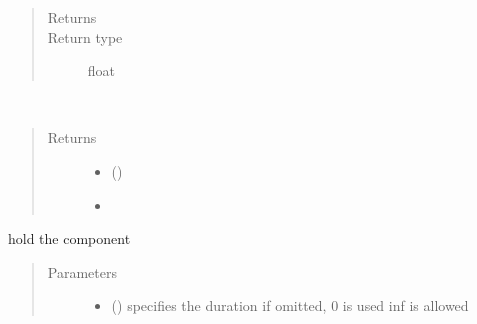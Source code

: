 \documentclass[letterpaper,10pt,english]{sphinxmanual}
\begin{document}
\begin{fulllineitems}
\begin{fulllineitems}
\begin{quote}
\begin{description}
\item[{Returns}] \leavevmode
{}

\item[{Return type}] \leavevmode
float

\end{description}\end{quote}

\end{fulllineitems}


\begin{fulllineitems}
\label{\detokenize{Reference:salabim.Component.failed}}~\begin{quote}\begin{description}
\item[{Returns}] \leavevmode
\begin{itemize}
\item {} 
 ()

\item {} 

\end{itemize}


\end{description}\end{quote}

\end{fulllineitems}


\begin{fulllineitems}
\label{\detokenize{Reference:salabim.Component.hold}}
hold the component
\begin{quote}\begin{description}
\item[{Parameters}] \leavevmode\begin{itemize}
\item {} 
 () \textendash{} specifies the duration 
if omitted, 0 is used 
inf is allowed


\end{itemize}
\end{description}
\end{quote}
\end{fulllineitems}
\end{fulllineitems}
\end{document}
